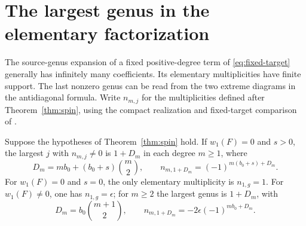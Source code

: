 \section{The largest genus in the elementary factorization}\label{sec:highest}

The source-genus expansion of a fixed positive-degree term of
\eqref{eq:fixed-target} generally has infinitely many coefficients.
Its elementary multiplicities have finite support. The last nonzero
genus can be read from the two extreme diagrams in the antidiagonal
formula. Write \(n_{m,j}\) for the multiplicities defined after
Theorem~\ref{thm:spin}, using the compact realization and fixed-target
comparison of \cite[Proposition~3.1 and its proof]{WueUnramified}.

\begin{theorem}\label{thm:highest}
Suppose the hypotheses of Theorem~\ref{thm:spin} hold.
If \(w_1(F)=0\) and \(s>0\), the largest \(j\) with
\(n_{m,j}\ne0\) is \(1+D_m\) in each degree \(m\ge1\), where
\[
 D_m=mb_0+(b_0+s)\binom m2,\qquad
 n_{m,1+D_m}=(-1)^{m(b_0+s)+D_m}.
\]
For \(w_1(F)=0\) and \(s=0\), the only elementary multiplicity is
\(n_{1,g}=1\). For \(w_1(F)\ne0\), one has \(n_{1,g}=\epsilon\);
for \(m\ge2\) the largest genus is \(1+D_m\), with
\[
 D_m=b_0\binom{m+1}2,\qquad
 n_{m,1+D_m}=-2\epsilon(-1)^{mb_0+D_m}.
\]
\end{theorem}
